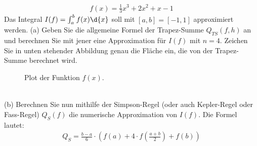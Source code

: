 \documentclass{scrartcl}
\begin{document}

	\begin{align*}
		f(x) = \frac{1}{3}x^3 + 2x^2 +x - 1
	\end{align*}
	Das Integral $I(f) = \int_{a}^{b}f(x)\d{x}$ soll mit $[a,b] = [-1,1]$ approximiert werden.
	\n
	(a)
	Geben Sie die allgemeine Formel der Trapez-Summe $Q_{TS}(f,h)$ an und berechnen Sie mit jener eine Approximation für $I(f)$ mit $n=4$.
	\n 
	Zeichen Sie in unten stehender Abbildung genau die Fläche ein, die von der Trapez-Summe berechnet wird.
	\begin{figure}[ht]
		\centering
		\caption{Plot der Funktion $f(x)$.}
	\end{figure}
	\lbreak
	\\
	(b)
	Berechnen Sie nun mithilfe der Simpson-Regel (oder auch Kepler-Regel oder Fass-Regel) $Q_{S}(f)$ die numerische Approximation von $I(f)$. Die Formel lautet:
	\begin{align*}
		Q_{S} = \frac{b - a}{6} \cdot \left( f(a) + 4\cdot f\left( \frac{a + b}{2} \right) + f(b) \right)
	\end{align*}
\end{document}
